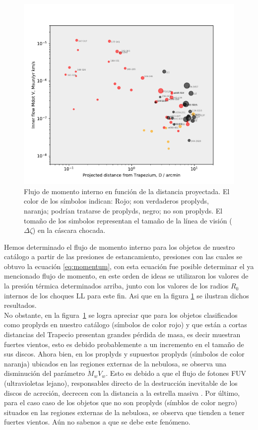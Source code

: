 \begin{figure}
  \centering
  \includegraphics[width=\linewidth, clip]{luis-programas/will-MdotV-vs-D.pdf}
  \caption{Flujo de momento interno  en función de la distancia proyectada. El color de los símbolos indican: Rojo; son verdaderos proplyds, naranja; podrían tratarse de proplyds, negro; no son proplyds. El tomaño de los simbolos representan el tamaño de la línea de visión (\(\Delta\zeta\)) en la cáscara chocada.  }
 \label{fig:flow}
\end{figure}


Hemos determinado el flujo de momento interno para los objetos de nuestro catálogo a partir de las presiones de estancamiento, presiones con las cuales se obtuvo la ecuación \ref{eq:momentum}, con esta ecuación fue posible determinar el ya mencionado flujo de momento, en este orden de ideas se utilizaron los valores de la presión térmica determinados arriba, junto con los valores de los radios \(R_{0}\) internos de los choques LL para este fin. Asi que en la figura \ref{fig:flow} se ilustran dichos resultados.\\

No obstante, en la figura~\ref{fig:flow} se logra apreciar que para los objetos clasificados como proplyds en nuestro catálogo (símbolos de color rojo) y que están a cortas distancias del Trapecio presentan grandes pérdida de masa, es decir  muestran fuertes vientos, esto es debido probablemente a un incremento en el tamaño de sus discos. Ahora bien, en los proplyds y supuestos proplyds (símbolos de color naranja) ubicados en las regiones externas de la nebulosa, se observa una disminución del parámetro \(\dot{M}_{w}V_{w}\). Esto es debido a que el flujo de fotones FUV (ultravioletas lejano), responsables directo de la destrucción inevitable de los discos de acreción, decrecen con la distancia a la estrella masiva \thC{}. Por último, para el caso caso de los objetos que no son proplyds (símblos de color negro) situados en las regiones externas de la nebulosa, se observa que tienden a tener fuertes vientos. Aún no sabenos a que se debe este fenómeno.\\ 

